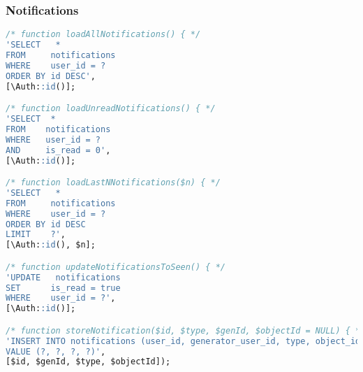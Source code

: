 \subsubsection{Notifications}
\begin{lstlisting}[language=sql]
/* function loadAllNotifications() { */
'SELECT   *
FROM     notifications
WHERE    user_id = ?
ORDER BY id DESC',
[\Auth::id()];

/* function loadUnreadNotifications() { */
'SELECT  *
FROM    notifications
WHERE   user_id = ?
AND     is_read = 0',
[\Auth::id()];

/* function loadLastNNotifications($n) { */
'SELECT   *
FROM     notifications
WHERE    user_id = ?
ORDER BY id DESC
LIMIT    ?',
[\Auth::id(), $n];

/* function updateNotificationsToSeen() { */
'UPDATE   notifications
SET      is_read = true
WHERE    user_id = ?',
[\Auth::id()];

/* function storeNotification($id, $type, $genId, $objectId = NULL) { */
'INSERT INTO notifications (user_id, generator_user_id, type, object_id)
VALUE (?, ?, ?, ?)',
[$id, $genId, $type, $objectId]);
\end{lstlisting}
